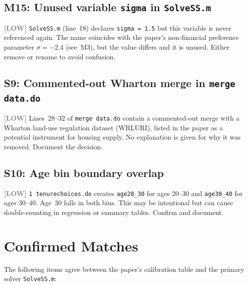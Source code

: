 \documentclass[11pt]{article}
\newcommand{\low}{\textcolor{gray}{\textbf{[LOW]}}}
\begin{document}
\subsection*{M15: Unused variable \texttt{sigma} in \texttt{SolveSS.m}}

\low{} \texttt{SolveSS.m} (line~18) declares \texttt{sigma = 1.5} but this variable
is never referenced again. The name coincides with the paper's non-financial preference
parameter $\sigma = -2.4$ (see~M3), but the value differs and it is unused. Either
remove or rename to avoid confusion.

\subsection*{S9: Commented-out Wharton merge in \texttt{merge data.do}}

\low{} Lines~28--32 of \texttt{merge data.do} contain a commented-out merge with a
Wharton land-use regulation dataset (WRLURI), listed in the paper as a potential
instrument for housing supply. No explanation is given for why it was removed.
Document the decision.

\subsection*{S10: Age bin boundary overlap}

\low{} \texttt{1 tenurechoices.do} creates \texttt{age20\_30} for ages 20--30
and \texttt{age30\_40} for ages 30--40. Age~30 falls in both bins. This may be
intentional but can cause double-counting in regression or summary tables.
Confirm and document.

\section*{Confirmed Matches}

The following items agree between the paper's calibration table and the primary
solver \texttt{SolveSS.m}:
\end{document}
